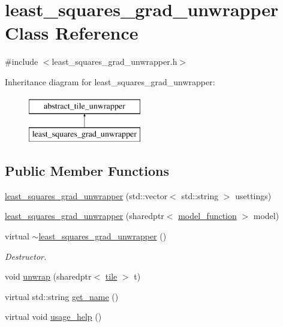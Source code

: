 \hypertarget{classleast__squares__grad__unwrapper}{\section{least\-\_\-squares\-\_\-grad\-\_\-unwrapper Class Reference}
\label{classleast__squares__grad__unwrapper}
}


{\ttfamily \#include $<$least\-\_\-squares\-\_\-grad\-\_\-unwrapper.\-h$>$}

Inheritance diagram for least\-\_\-squares\-\_\-grad\-\_\-unwrapper\-:\begin{figure}[H]
\begin{center}
\leavevmode
\includegraphics[height=2.000000cm]{classleast__squares__grad__unwrapper}
\end{center}
\end{figure}
\subsection*{Public Member Functions}
\begin{DoxyCompactItemize}
\item 
\hyperlink{classleast__squares__grad__unwrapper_a33a10b9f3200e5b1fb5827dc50687772}{least\-\_\-squares\-\_\-grad\-\_\-unwrapper} (std\-::vector$<$ std\-::string $>$ usettings)
\item 
\hyperlink{classleast__squares__grad__unwrapper_ab22c6e1009b5b8ceae4dea542d0f469d}{least\-\_\-squares\-\_\-grad\-\_\-unwrapper} (sharedptr$<$ \hyperlink{classmodel__function}{model\-\_\-function} $>$ model)
\item 
\hypertarget{classleast__squares__grad__unwrapper_ab7a1685800926ffbba4b1e829a21052d}{virtual \hyperlink{classleast__squares__grad__unwrapper_ab7a1685800926ffbba4b1e829a21052d}{$\sim$least\-\_\-squares\-\_\-grad\-\_\-unwrapper} ()}\label{classleast__squares__grad__unwrapper_ab7a1685800926ffbba4b1e829a21052d}

\begin{DoxyCompactList}\small\item\em Destructor. \end{DoxyCompactList}\item 
void \hyperlink{classleast__squares__grad__unwrapper_a4a0c29f7e7cfa21b5a87a291565d123f}{unwrap} (sharedptr$<$ \hyperlink{classtile}{tile} $>$ t)
\item 
virtual std\-::string \hyperlink{classleast__squares__grad__unwrapper_af66d1a659d6cfbb82200d120f43dd939}{get\-\_\-name} ()
\item 
virtual void \hyperlink{classleast__squares__grad__unwrapper_a8795b4b968a336d28a81e910cbc9f4ab}{usage\-\_\-help} ()
\end{DoxyCompactItemize}


